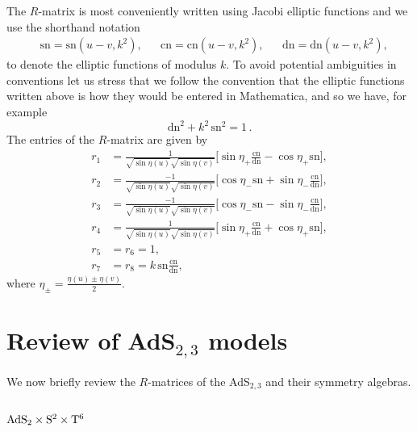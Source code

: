 \documentclass[12pt,a4paper]{article}
\numberwithin{equation}{section}
\begin{document}
The $R$-matrix is most conveniently written using Jacobi elliptic functions and we use the shorthand notation 
%
\begin{align}
&\mathrm{sn} =\mathrm{sn}(u-v,k^2) ,
&&\mathrm{cn} =\mathrm{cn}(u-v,k^2) ,
&&\mathrm{dn} =\mathrm{dn}(u-v,k^2) ,
\end{align}
%
to denote the elliptic functions of modulus $k$. To avoid potential ambiguities in conventions let us stress that we follow the convention that the elliptic functions written above is how they would be entered in Mathematica, and so we have, for example 
\begin{equation}
\mathrm{dn}^2+k^2\, \mathrm{sn}^2=1\,.
\end{equation}
%
The entries of the $R$-matrix are given by
\begin{align}
r_1 &= 
\frac{1}{\sqrt{\sin \eta(u)}\sqrt{\sin\eta(v)}}  \bigg[\sin\eta_+\frac{\mathrm{cn}}{\mathrm{dn}} 
-\cos\eta_+ \mathrm{sn}\bigg], \nonumber\\
r_2 &= 
\frac{-1}{\sqrt{\sin \eta(u)}\sqrt{\sin\eta(v)}}  \bigg[\cos\eta_-\mathrm{sn} +\sin\eta_-\frac{\mathrm{cn}}{\mathrm{dn}} 
\bigg],\nonumber\\
r_3 &= 
\frac{-1}{\sqrt{\sin \eta(u)}\sqrt{\sin\eta(v)}}  \bigg[\cos\eta_-\mathrm{sn}  - \sin\eta_-\frac{\mathrm{cn}}{\mathrm{dn}} 
\bigg],\nonumber\\
r_4 &= 
\frac{1}{\sqrt{\sin \eta(u)}\sqrt{\sin\eta(v)}}  \bigg[\sin\eta_+\frac{\mathrm{cn}}{\mathrm{dn}} 
+\cos\eta_+ \mathrm{sn}\bigg],\nonumber\\
r_5&=r_6=1,\nonumber\\
r_7 &= r_8 = k\, \mathrm{sn}\frac{\mathrm{cn}}{\mathrm{dn}},
\label{8vertex}
\end{align}
%
where $\eta_\pm = \frac{\eta(u) \pm \eta(v)}{2}$. 

\iffalse
\section{Review of AdS$_{2,3}$ models}

We now briefly review the $R$-matrices of the AdS$_{2,3}$ and their symmetry algebras.

\subsection{${\rm AdS}_{2}\times {\rm S}^2\times {\rm T}^6$}
\end{document}
